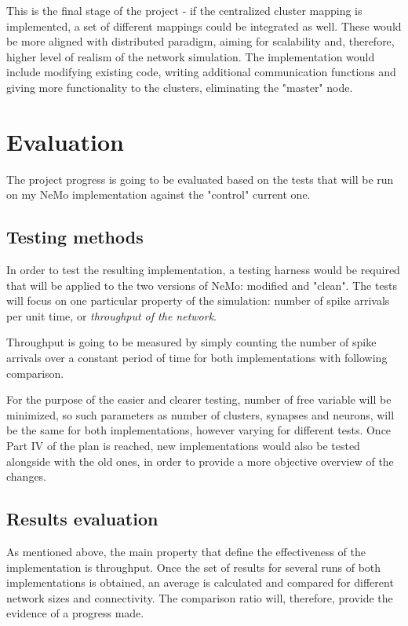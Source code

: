 \documentclass[12pt]{report}
\begin{document}
This is the final stage of the project - if the centralized cluster mapping is implemented, a set of different mappings could be integrated as well. These would be more aligned with distributed
paradigm, aiming for scalability and, therefore, higher level of realism of the network simulation. The implementation would include modifying existing code, writing additional communication 
functions and giving more functionality to the clusters, eliminating the "master" node.

\section{Evaluation}

The project progress is going to be evaluated based on the tests that will be run on my NeMo implementation against the "control" current one.

\subsection{Testing methods}

In order to test the resulting implementation, a testing harness would be required that will be applied to the two versions of NeMo: modified and "clean".
The tests will focus on one particular property of the simulation: number of spike arrivals per unit time, or \emph{throughput of the network}.

Throughput is going to be measured by simply counting the number of spike arrivals over a constant period of time for both implementations with following comparison.

For the purpose of the easier and clearer testing, number of free variable will be minimized, so such parameters as number of clusters, synapses and 
neurons, will be the same for both implementations, however varying for different tests. Once Part IV of the plan is reached, new implementations would also be tested alongside with the old ones, 
in order to provide a more objective overview of the changes.

\subsection{Results evaluation}

As mentioned above, the main property that define the effectiveness of the implementation is throughput.
Once the set of results for several runs of both implementations is obtained, an average is calculated and compared for different network sizes and connectivity.
The comparison ratio will, therefore, provide the evidence of a progress made.
\end{document}
